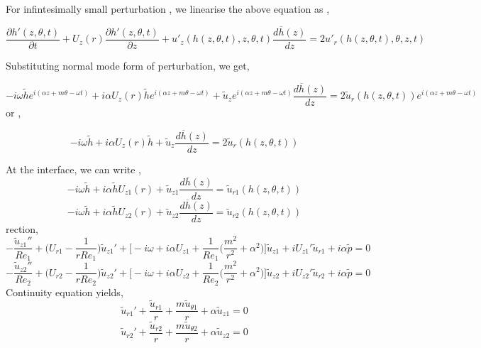 \documentclass{article}
\begin{document}
For infintesimally small perturbation , we linearise the above equation as , 

\begin{equation}
\frac{\partial{h'(z,\theta,t)}}{\partial{t}} + U_{z}(r)\frac{\partial{h'(z,\theta,t)}}{\partial{z}} + u'_{z}(h(z,\theta , t),z,\theta ,t)\frac{d\overline{h}(z)}{dz} = 2u'_{r}(h(z,\theta,t),\theta ,z,t)
\end{equation}


Substituting normal mode form of perturbation, we get,

\begin{equation}
-i\omega \tilde{h} e^{i(\alpha z + m\theta - \omega t)} + i\alpha  U_{z}(r)\tilde{h} e^{i(\alpha z + m\theta - \omega t)} + \tilde{u}_{z} e^{i(\alpha z + m\theta - \omega t)}\frac{d\overline{h}(z)}{dz} = 2\tilde{u}_{r}(h(z,\theta,t))e^{i(\alpha z + m\theta - \omega t)}
\end{equation}
or ,

\begin{equation}
-i\omega \tilde{h}  + i\alpha  U_{z}(r)\tilde{h}  + \tilde{u}_{z}\frac{d\overline{h}(z)}{dz}  = 2\tilde{u}_{r}(h(z,\theta,t))
\end{equation}

At the interface, we can write ,
\begin{equation}
-i\omega \tilde{h} + i\alpha \tilde{h}U_{z1}(r) + \tilde{u}_{z1}\frac{d\overline{h}(z)}{dz} = \tilde{u}_{r1}(h(z,\theta , t))
\end{equation}
\begin{equation}
-i\omega \tilde{h} + i\alpha \tilde{h}U_{z2}(r) + \tilde{u}_{z2}\frac{d\overline{h}(z)}{dz} = \tilde{u}_{r2}(h(z,\theta , t))
\end{equation}rection,
\begin{equation}
\label{axilinear1}
-\frac{\tilde{u}_{z1}''}{Re_{1}} + \Bigg( U_{r1}-\frac{1}{rRe_{1}}\Bigg)\tilde{u}_{z1}' +
\Bigg[-i\omega + i\alpha U_{z1}  + \frac{1}{Re_{1}}\Bigg(\frac{m^2}{r^2}+ \alpha ^2\Bigg)\Bigg]\tilde{u}_{z1} + iU_{z1}'\tilde{u}_{r1} + i\alpha \tilde{p} = 0
\end{equation}
\begin{equation}
\label{axilinear2}
-\frac{\tilde{u}_{z2}''}{Re_{2}} + \Bigg( U_{r2}-\frac{1}{rRe_{2}}\Bigg)\tilde{u}_{z2}' +
\Bigg[-i\omega + i\alpha U_{z2}  + \frac{1}{Re_{2}}\Bigg(\frac{m^2}{r^2}+ \alpha ^2\Bigg)\Bigg]\tilde{u}_{z2} + iU_{z2}'\tilde{u}_{r2} + i\alpha \tilde{p} = 0
\end{equation}
Continuity equation yields,
\begin{equation}
\label{linearconti}
\tilde{u}_{r1}' + \frac{\tilde{u}_{r1}}{r} + \frac{m\tilde{u}_{\theta 1}}{r}+ 
\alpha \tilde{u}_{z1} = 0
\end{equation}
\begin{equation}
\label{linearconti}
\tilde{u}_{r2}' + \frac{\tilde{u}_{r2}}{r} + \frac{m\tilde{u}_{\theta 2}}{r}+ 
\alpha \tilde{u}_{z2} = 0
\end{equation}
\end{document}
